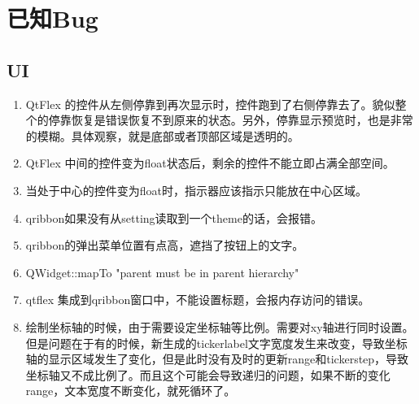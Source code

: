 \section{已知Bug}

\subsection{UI}

\begin{enumerate}
	\item QtFlex 的控件从左侧停靠到再次显示时，控件跑到了右侧停靠去了。貌似整个的停靠恢复是错误恢复不到原来的状态。另外，停靠显示预览时，也是非常的模糊。具体观察，就是底部或者顶部区域是透明的。
	\item QtFlex 中间的控件变为float状态后，剩余的控件不能立即占满全部空间。
	\item 当处于中心的控件变为float时，指示器应该指示只能放在中心区域。
	
	\item qribbon如果没有从setting读取到一个theme的话，会报错。
	
	\item qribbon的弹出菜单位置有点高，遮挡了按钮上的文字。
	
	\item QWidget::mapTo "parent must be in parent hierarchy"
	
	\item qtflex 集成到qribbon窗口中，不能设置标题，会报内存访问的错误。
	
	\item 绘制坐标轴的时候，由于需要设定坐标轴等比例。需要对xy轴进行同时设置。但是问题在于有的时候，新生成的tickerlabel文字宽度发生来改变，导致坐标轴的显示区域发生了变化，但是此时没有及时的更新range和tickerstep，导致坐标轴又不成比例了。而且这个可能会导致递归的问题，如果不断的变化range，文本宽度不断变化，就死循环了。
\end{enumerate}